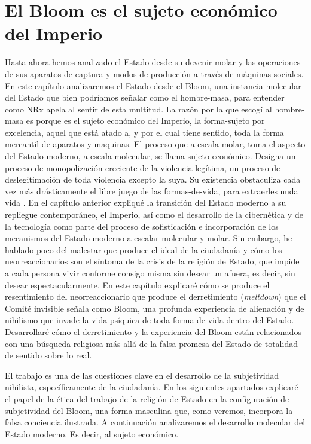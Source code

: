 \chapter{El Bloom es el sujeto económico del Imperio}
\label{cha:el-bloom-es-el-sujeto-económico-del-imperio}

Hasta ahora hemos analizado el Estado desde su devenir molar y las operaciones de sus aparatos de captura y modos de producción a través de máquinas sociales. En este capítulo analizaremos el Estado desde el Bloom, una instancia molecular del Estado que bien podríamos señalar como el hombre-masa, para entender como NRx apela al sentir de esta multitud. La razón por la que escogí al hombre-masa es porque es el sujeto económico del Imperio, la forma-sujeto por excelencia, aquel que está atado a, y por el cual tiene sentido, toda la forma mercantil de aparatos y maquinas. El proceso que a escala molar, toma el aspecto del Estado moderno, a escala molecular, se llama sujeto económico. Designa un proceso de monopolización creciente de la violencia legítima, un proceso de deslegitimación de toda violencia excepto la suya. Su existencia obstaculiza cada vez más drásticamente el libre juego de las formas-de-vida, para extraerles nuda vida \autocite{tiqqunIntroduccionGuerraCivil2008}. En el capítulo anterior expliqué la transición del Estado moderno a su repliegue contemporáneo, el Imperio, así como el desarrollo de la cibernética y de la tecnología como parte del proceso de sofisticación e incorporación de los mecanismos del Estado moderno a escalar molecular y molar. Sin embargo, he hablado poco del malestar que produce el ideal de la ciudadanía y cómo los neorreaccionarios son el síntoma de la crisis de la religión de Estado, que impide a cada persona vivir conforme consigo misma sin desear un afuera, es decir, sin desear espectacularmente. En este capítulo explicaré cómo se produce el resentimiento del neorreaccionario que produce el derretimiento (\emph{meltdown}) que el Comité invisible señala como Bloom, una profunda experiencia de alienación y de nihilismo que invade la vida psíquica de toda forma de vida dentro del Estado. Desarrollaré cómo el derretimiento y la experiencia del Bloom están relacionados con una búsqueda religiosa más allá de la falsa promesa del Estado de totalidad de sentido sobre lo real.

El trabajo es una de las cuestiones clave en el desarrollo de la subjetividad nihilista, específicamente de la ciudadanía. En los siguientes apartados explicaré el papel de la ética del trabajo de la religión de Estado en la configuración de subjetividad del Bloom, una forma masculina que, como veremos, incorpora la falsa conciencia ilustrada. A continuación analizaremos el desarrollo molecular del Estado moderno. Es decir, al sujeto económico.

